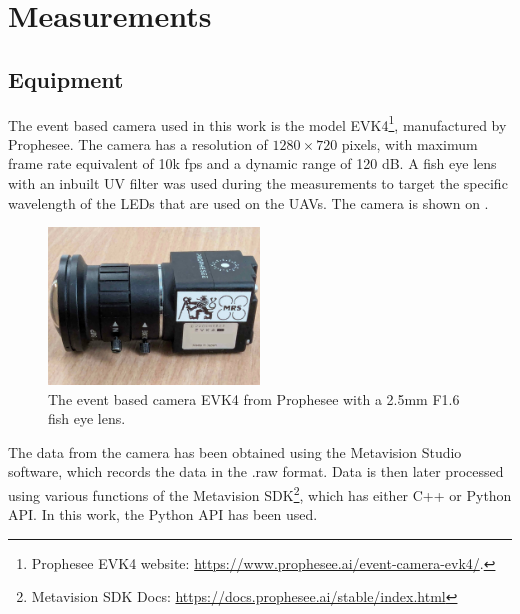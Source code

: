 
\chapter{Measurements\label{chap:measurements}}

\section{Equipment}

The event based camera used in this work is the model EVK4\footnote{Prophesee EVK4 website: \url{https://www.prophesee.ai/event-camera-evk4/}.}, manufactured by Prophesee. The camera has a resolution of 
$1280 \times 720$ pixels, with maximum frame rate equivalent of 10k fps and a dynamic range of 120 dB.
A fish eye lens with an inbuilt UV filter was used during the measurements to target the specific wavelength of the LEDs
that are used on the UAVs. The camera is shown on . 


\begin{figure}[H]
	\centering
	\includegraphics[width=0.50\textwidth]{./fig/photos/camera_with_lens.jpg}
	\caption{The event based camera EVK4 from Prophesee with a 2.5mm F1.6 fish eye lens.}
	\label{fig:evk4}
\end{figure}

The data from the camera has been obtained using the Metavision Studio software, which records the data in the .raw format.
Data is then later processed using various functions of the Metavision SDK\footnote{Metavision SDK Docs: \url{https://docs.prophesee.ai/stable/index.html}},
which has either C++ or Python API. In this work, the Python API has been used.

